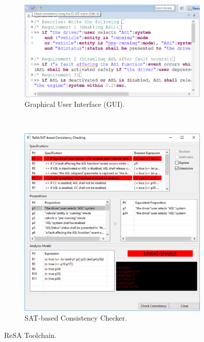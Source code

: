 \begin{figure}
    \centering
    \begin{subfigure}[b]{0.475  \textwidth}
        \includegraphics[width=\textwidth]{resa_editor}
        \caption{Graphical User Interface (GUI).}
        \label{fig_gui}
    \end{subfigure}
    ~
        \begin{subfigure}[b]{0.475\textwidth}
        \includegraphics[width=\textwidth]{consistencychecker.jpg}
        \caption{SAT-based Consistency Checker.}
        \label{fig_power}
    \end{subfigure}
    \caption{ReSA Toolchain.}
    \label{fig_consistencychecker}
\end{figure}

